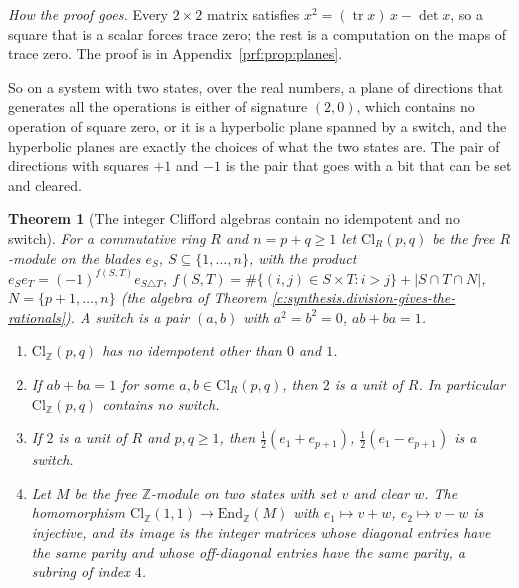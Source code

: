\documentclass[11pt]{article}
\newtheorem{theorem}{Theorem}[section]
\theoremstyle{definition}
\theoremstyle{plain}
\newcommand{\changedmark}[2]{\marginpar{\raggedright\scriptsize\color{#1}#2}}
\providecommand{\Cl}{}\renewcommand{\Cl}{\mathrm{Cl}}
\providecommand{\Z}{}\renewcommand{\Z}{\mathbb{Z}}
\begin{document}
\label{c:note.geometry-first.setting-switch-what-bit-does-4}
\noindent\emph{How the proof goes.} Every $2 \times 2$ matrix satisfies $x^{2} = (\operatorname{tr} x)\,x - \det x$, so a square that is a scalar forces trace zero; the rest is a computation on the maps of trace zero. The proof is in Appendix~\ref{prf:prop:planes}.

So on a system with two states, over the real numbers, a plane of directions that generates all the operations is either of signature $(2,0)$, which contains no operation of square zero, or it is a hyperbolic plane spanned by a switch, and the hyperbolic planes are exactly the choices of what the two states are. The pair of directions with squares $+1$ and $-1$ is the pair that goes with a bit that can be set and cleared.

\begin{theorem}[The integer Clifford algebras contain no idempotent and no switch]\label{c:synthesis.integer-clifford-algebras-contain-no-switch}
\changedmark{BurntOrange}{changed since the deposit}
For a commutative ring $R$ and $n = p + q \ge 1$ let $\Cl_{R}(p,q)$ be the free $R$-module on the blades $e_{S}$, $S \subseteq \{1, \dots, n\}$, with the product $e_{S}e_{T} = (-1)^{f(S,T)}e_{S \triangle T}$, $f(S,T) = \#\{(i,j) \in S \times T : i > j\} + |S \cap T \cap N|$, $N = \{p + 1, \dots, n\}$ (the algebra of Theorem \ref{c:synthesis.division-gives-the-rationals}). A \emph{switch} is a pair $(a, b)$ with $a^{2} = b^{2} = 0$, $ab + ba = 1$.
\begin{enumerate}
\item[(i)] $\Cl_{\Z}(p,q)$ has no idempotent other than $0$ and $1$.
\item[(ii)] If $ab + ba = 1$ for some $a, b \in \Cl_{R}(p,q)$, then $2$ is a unit of $R$. In particular $\Cl_{\Z}(p,q)$ contains no switch.
\item[(iii)] If $2$ is a unit of $R$ and $p, q \ge 1$, then $\tfrac12(e_{1} + e_{p+1})$, $\tfrac12(e_{1} - e_{p+1})$ is a switch.
\item[(iv)] Let $M$ be the free $\Z$-module on two states with set $v$ and clear $w$. The homomorphism $\Cl_{\Z}(1,1) \to \mathrm{End}_{\Z}(M)$ with $e_{1} \mapsto v + w$, $e_{2} \mapsto v - w$ is injective, and its image is the integer matrices whose diagonal entries have the same parity and whose off-diagonal entries have the same parity, a subring of index $4$.
\end{enumerate}
\end{theorem}
\end{document}
